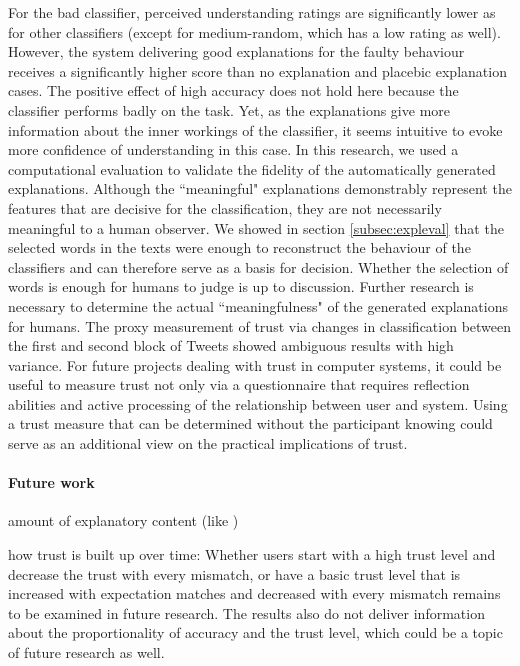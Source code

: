 For the bad classifier, perceived understanding ratings are significantly lower as for other classifiers (except for medium-random, which has a low rating as well). However, the system delivering good explanations for the faulty behaviour receives a significantly higher score than no explanation and placebic explanation cases. The positive effect of high accuracy does not hold here because the classifier performs badly on the task. Yet, as the explanations give more information about the inner workings of the classifier, it seems intuitive to evoke more confidence of understanding in this case. \medskip \newline
In this research, we used a computational evaluation to validate the fidelity of the automatically generated explanations. Although the ``meaningful" explanations demonstrably represent the features that are decisive for the classification, they are not necessarily meaningful to a human observer. We showed in section \ref{subsec:expleval} that the selected words in the texts were enough to reconstruct the behaviour of the classifiers and can therefore serve as a basis for decision. Whether the selection of words is enough for humans to judge is up to discussion. Further research is necessary to determine the actual ``meaningfulness" of the generated explanations for humans.\newline
The proxy measurement of trust via changes in classification between the first and second block of Tweets showed ambiguous results with high variance. For future projects dealing with trust in computer systems, it could be useful to measure trust not only via a questionnaire that requires reflection abilities and active processing of the relationship between user and system. Using a trust measure that can be determined without the participant knowing could serve as an additional view on the practical implications of trust.

\paragraph{Future work}
amount of explanatory content (like \cite{ribeiro2018anchors})

how trust is built up over time:
Whether users start with a high trust level and decrease the trust with every mismatch, or have a basic trust level that is increased with expectation matches and decreased with every mismatch remains to be examined in future research. The results also do not deliver information about the proportionality of accuracy and the trust level, which could be a topic of future research as well. 



